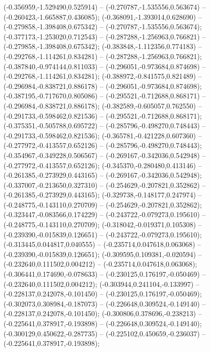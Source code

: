 (-0.356959,-1.529490,0.525914) -- (-0.270787,-1.535556,0.563674) -- (-0.260423,-1.665887,0.436085);
 (-0.368091,-1.393014,0.628690) -- (-0.279858,-1.398408,0.675342) -- (-0.270787,-1.535556,0.563674);
 (-0.377173,-1.253020,0.712543) -- (-0.287288,-1.256963,0.766821) -- (-0.279858,-1.398408,0.675342);
 (-0.383848,-1.112356,0.774183) -- (-0.292768,-1.114261,0.834281) -- (-0.287288,-1.256963,0.766821);
 (-0.387840,-0.974144,0.811033) -- (-0.296051,-0.973684,0.874698) -- (-0.292768,-1.114261,0.834281);
 (-0.388972,-0.841575,0.821489) -- (-0.296984,-0.838721,0.886178) -- (-0.296051,-0.973684,0.874698);
 (-0.387195,-0.717670,0.805086) -- (-0.295521,-0.712688,0.868171) -- (-0.296984,-0.838721,0.886178);
 (-0.382589,-0.605057,0.762550) -- (-0.291733,-0.598462,0.821536) -- (-0.295521,-0.712688,0.868171);
 (-0.375351,-0.505788,0.695722) -- (-0.285796,-0.498270,0.748443) -- (-0.291733,-0.598462,0.821536);
 (-0.365781,-0.421228,0.607360) -- (-0.277972,-0.413557,0.652126) -- (-0.285796,-0.498270,0.748443);
 (-0.354967,-0.349228,0.506567) -- (-0.269167,-0.342036,0.542948) -- (-0.277972,-0.413557,0.652126);
 (-0.345370,-0.280480,0.413146) -- (-0.261385,-0.273929,0.443165) -- (-0.269167,-0.342036,0.542948);
 (-0.337007,-0.213650,0.327310) -- (-0.254629,-0.207821,0.352862) -- (-0.261385,-0.273929,0.443165);
 (-0.329738,-0.148177,0.247974) -- (-0.248775,-0.143110,0.270709) -- (-0.254629,-0.207821,0.352862);
 (-0.323447,-0.083566,0.174229) -- (-0.243722,-0.079273,0.195610) -- (-0.248775,-0.143110,0.270709);
 (-0.318042,-0.019371,0.105308) -- (-0.239390,-0.015839,0.126651) -- (-0.243722,-0.079273,0.195610);
 (-0.313445,0.044817,0.040555) -- (-0.235714,0.047618,0.063068) -- (-0.239390,-0.015839,0.126651);
 (-0.309595,0.109381,-0.020594) -- (-0.232640,0.111502,0.004212) -- (-0.235714,0.047618,0.063068);
 (-0.306441,0.174690,-0.078633) -- (-0.230125,0.176197,-0.050469) -- (-0.232640,0.111502,0.004212);
 (-0.303944,0.241104,-0.133997) -- (-0.228137,0.242078,-0.101450) -- (-0.230125,0.176197,-0.050469);
 (-0.302073,0.308984,-0.187073) -- (-0.226648,0.309524,-0.149140) -- (-0.228137,0.242078,-0.101450);
 (-0.300806,0.378696,-0.238213) -- (-0.225641,0.378917,-0.193898) -- (-0.226648,0.309524,-0.149140);
 (-0.300129,0.450622,-0.287735) -- (-0.225102,0.450659,-0.236037) -- (-0.225641,0.378917,-0.193898);
